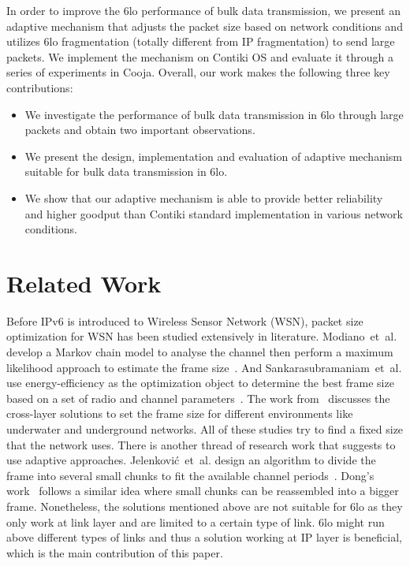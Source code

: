 \documentclass[runningheads,a4paper]{llncs}
\begin{document}
In order to improve the 6lo performance of bulk data transmission, we present an adaptive mechanism that adjusts the packet size based on network conditions and utilizes 6lo fragmentation (totally different from IP fragmentation) to send large packets. We implement the mechanism on Contiki OS and evaluate it through a series of experiments in Cooja. Overall, our work makes the following three key contributions:
\begin{itemize}
\item We investigate the performance of bulk data transmission in 6lo through large packets and obtain two important observations.
\item We present the design, implementation and evaluation of adaptive mechanism suitable for bulk data transmission in 6lo.
\item We show that our adaptive mechanism is able to provide better reliability and higher goodput than Contiki standard implementation in various network conditions.
\end{itemize}

\section{Related Work}
Before IPv6 is introduced to Wireless Sensor Network (WSN), packet size optimization for WSN has been studied extensively in literature. Modiano~et~al. develop a Markov chain model to analyse the channel then perform a maximum likelihood approach to estimate the frame size~\cite{Modi1999}. And Sankarasubramaniam~et~al. use energy-efficiency as the optimization object to determine the best frame size based on a set of radio and channel parameters~\cite{Sank2003}. The work from~\cite{Vura2008} discusses the cross-layer solutions to set the frame size for different environments like underwater and underground networks. All of these studies try to find a fixed size that the network uses. There is another thread of research work that suggests to use adaptive approaches. Jelenkovi\'{c}~et~al. design an algorithm to divide the frame into several small chunks to fit the available channel periods~\cite{Jele2008}. Dong's work~\cite{Dong2010} follows a similar idea where small chunks can be reassembled into a bigger frame. Nonetheless, the solutions mentioned above are not suitable for 6lo as they only work at link layer and are limited to a certain type of link. 6lo might run above different types of links and thus a solution working at IP layer is beneficial, which is the main contribution of this paper.
\end{document}
